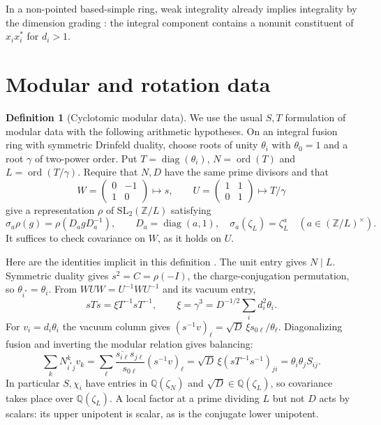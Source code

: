 \documentclass[11pt]{amsart}
\numberwithin{equation}{section}
\theoremstyle{definition}
\newtheorem{definition}[theorem]{Definition}
\theoremstyle{plain}
\newcommand{\QQ}{\mathbb Q}
\newcommand{\ZZ}{\mathbb Z}
\begin{document}
In a non-pointed based-simple ring, weak integrality already implies integrality by the dimension grading \cite[Theorem~3.10]{GelakiNikshych}: the integral component contains a nonunit constituent of $x_ix_i^*$ for $d_i>1$.

\section{Modular and rotation data}\label{alg:modular}

\begin{definition}[Cyclotomic modular data]\label{alg:mod-data}
We use the usual $S,T$ formulation of modular data
\cite[Definition~1]{GannonData} with the following arithmetic hypotheses.
On an integral fusion ring with symmetric Drinfeld duality, choose
roots of unity $\theta_i$ with $\theta_0=1$ and a root $\gamma$ of
two-power order. Put $T=\operatorname{diag}(\theta_i)$,
$N=\operatorname{ord}(T)$ and $L=\operatorname{ord}(T/\gamma)$.
Require that $N,D$ have the same prime divisors and that
\[
 W=\begin{pmatrix}0&-1\\1&0\end{pmatrix}\longmapsto s,\qquad
 U=\begin{pmatrix}1&1\\0&1\end{pmatrix}\longmapsto T/\gamma
\]
give a representation $\rho$ of $\mathrm{SL}_2(\ZZ/L)$ satisfying
\begin{equation}\label{alg:covariance}
 \sigma_a\rho(g)=\rho(D_a gD_a^{-1}),\qquad D_a=\operatorname{diag}(a,1),
 \quad \sigma_a(\zeta_L)=\zeta_L^a\quad(a\in(\ZZ/L)^\times).
\end{equation}
It suffices to check covariance on $W$, as it holds on $U$.
\end{definition}

Here are the identities implicit in this definition
\cite[\S1.3]{DLNCongruence}. The unit entry gives $N\mid L$.
Symmetric duality gives $s^2=C=\rho(-I)$, the charge-conjugation
permutation, so $\theta_{i^*}=\theta_i$. From
$WUW=U^{-1}WU^{-1}$ and its vacuum entry,
\[
 sTs=\xi T^{-1}sT^{-1},\qquad
 \xi=\gamma^3=D^{-1/2}\sum_i d_i^2\theta_i .
\]
For $v_i=d_i\theta_i$ the vacuum column gives
$(s^{-1}v)_\ell=\sqrt D\,\xi s_{0\ell}/\theta_\ell$.
Diagonalizing fusion and inverting the modular relation gives balancing:
\[
 \sum_kN_{i^*j}^k v_k
 =\sum_\ell\frac{\overline{s_{i\ell}}s_{j\ell}}{s_{0\ell}}(s^{-1}v)_\ell
 =\sqrt D\,\xi(sT^{-1}s^{-1})_{ji}=\theta_i\theta_j S_{ij}.
\]
In particular $S,\chi_i$ have entries in $\QQ(\zeta_N)$ and
$\sqrt D\in\QQ(\zeta_L)$, so covariance takes place over $\QQ(\zeta_L)$.
A local factor at a prime dividing $L$ but not $D$ acts by scalars:
its upper unipotent is scalar, as is the conjugate lower unipotent.
\end{document}
